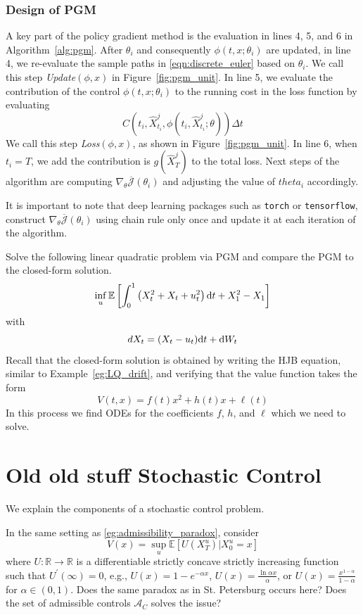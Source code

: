 \documentclass[11pt]{book}
\newcommand{\dt}{\text{\normalfont d}t}
\newcommand{\dW}{\text{\normalfont d}W}
\begin{document}
\subsection{Design of PGM}
A key part of the policy gradient method is the evaluation in lines 4, 5, and 6 in Algorithm~\ref{alg:pgm}. After $\theta_i$ and consequently $\phi(t,x;\theta_i)$ are updated, in line 4, we  re-evaluate the sample paths in \eqref{eqn:discrete_euler} based on $\theta_i$. 
We call this step \emph{Update$(\phi,x)$} in Figure~\ref{fig:pgm_unit}. In line 5, we evaluate the contribution of the control $\phi(t,x;\theta_i)$ to the running cost in the loss function by evaluating
\[
C(t_{i},\hat{X}^j_{t_i},\phi(t_{i},\hat{X}^j_{t_{i}};\theta))\Delta t
\]
We call this step \emph{Loss$(\phi,x)$}, as shown in Figure~\ref{fig:pgm_unit}. In line 6, when $t_i=T$, we add the contribution is $g(\hat{X}^j_T)$ to the total loss. Next steps of the algorithm are computing $\nabla_\theta \overline{\mathcal{J}}(\theta_{i})$ and adjusting the value of $theta_i$ accordingly. 

It is important to note that deep learning packages such as \verb|torch| or \verb|tensorflow|, construct $\nabla_\theta \overline{\mathcal{J}}(\theta_{i})$ using chain rule only once and update it at each iteration of the algorithm. 

\begin{ex}
    Solve the following linear quadratic problem via PGM and compare the PGM to the closed-form solution.
    \[
    \inf_u\mathbb{E}\left[\int_0^1\left(X_t^2+X_t+u_t^2\right)\dt + X_1^2 -X_1\right]
    \]
    with
    \[
    dX_t=(X_t-u_t)\dt+\dW_t
    \]
Recall that the closed-form solution is obtained by writing the HJB equation, similar to Example~\ref{eg:LQ_drift}, and verifying that the value function takes the form 
\[
V(t,x)=f(t)x^2+h(t)x+\ell(t)
\]
In this process we find ODEs for the coefficients $f$, $h$, and $\ell$ which we need to solve.
\end{ex}
\chapter{Old old stuff Stochastic Control}
We explain the components of a stochastic control problem.

\begin{ex}
    In the same setting as \ref{eg:admissibility_paradox}, consider
    \begin{equation}\label{prob:merton}
        V(x) = \sup_{u}\mathbb{E}[U(X_T^u)|X^u_0=x]
    \end{equation}
    where $U:\mathbb{R}\to\mathbb{R}$ is a differentiable strictly concave strictly increasing function such that $U^\prime(\infty)=0$, e.g., $U(x)=1-e^{-\alpha x}$, $U(x) = \frac{\ln \alpha x}{\alpha}$, or $U(x) = \frac{x^{1-\alpha}}{1-\alpha}$ for $\alpha\in(0,1)$.
    Does the same paradox as in St. Petersburg occurs here?
    Does the set of admissible controls $\mathcal{A}_C$ solves the issue?
\end{ex}
\end{document}
